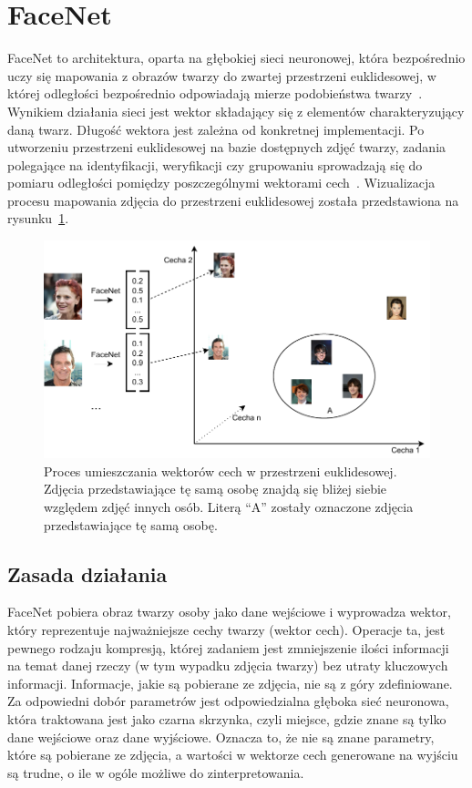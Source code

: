 \section{FaceNet}

FaceNet to architektura, oparta na głębokiej sieci neuronowej, która bezpośrednio uczy się mapowania
z obrazów twarzy do zwartej przestrzeni euklidesowej,
w której odległości bezpośrednio odpowiadają mierze podobieństwa twarzy~\cite{schroff2015facenet}.
Wynikiem działania sieci jest wektor składający się z elementów charakteryzujący daną twarz.
Długość wektora jest zależna od konkretnej implementacji.
Po utworzeniu przestrzeni euklidesowej na bazie dostępnych zdjęć twarzy,
zadania polegające na identyfikacji, weryfikacji czy grupowaniu
sprowadzają się do pomiaru odległości pomiędzy poszczególnymi wektorami cech~\cite{schroff2015facenet}.
Wizualizacja procesu mapowania zdjęcia do przestrzeni
euklidesowej została przedstawiona na rysunku~\ref{fig:facenet_zastosowanie}.

\begin{figure}[]
    \centering
    \includegraphics[width=1\textwidth]{images/facenet_euc}
    \caption{
        Proces umieszczania wektorów cech w przestrzeni euklidesowej.
        Zdjęcia przedstawiające tę samą osobę znajdą się bliżej siebie względem zdjęć innych osób.
        Literą ``A'' zostały oznaczone zdjęcia przedstawiające tę samą osobę.
    }
    \customsource
    \label{fig:facenet_zastosowanie}
\end{figure}

\subsection{Zasada działania}

FaceNet pobiera obraz twarzy osoby jako dane wejściowe i wyprowadza wektor,
który reprezentuje najważniejsze cechy twarzy (wektor cech).
Operacje ta, jest pewnego rodzaju kompresją, której zadaniem jest zmniejszenie ilości informacji
na temat danej rzeczy (w tym wypadku zdjęcia twarzy) bez utraty kluczowych informacji.
Informacje, jakie są pobierane ze zdjęcia, nie są z góry zdefiniowane.
Za odpowiedni dobór parametrów jest odpowiedzialna głęboka sieć neuronowa, która traktowana jest
jako czarna skrzynka, czyli miejsce, gdzie znane są tylko dane wejściowe oraz dane wyjściowe.
Oznacza to, że nie są znane parametry, które są pobierane ze zdjęcia,
a wartości w wektorze cech generowane na wyjściu są trudne, o ile w ogóle możliwe do zinterpretowania.

